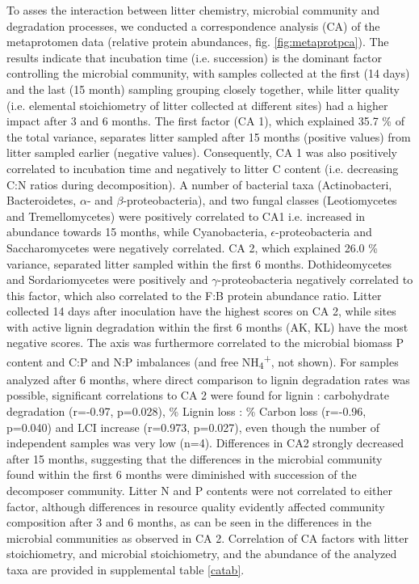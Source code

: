 To asses the interaction between litter chemistry, microbial community and degradation processes, we conducted a correspondence analysis (CA) of the metaprotomen data (relative protein abundances, fig. \ref{fig:metaprotpca}). The results indicate that incubation time (i.e. succession) is the dominant factor controlling the microbial community, with samples collected at the first (14 days) and the last (15 month) sampling grouping closely together, while litter quality (i.e. elemental stoichiometry of litter collected at different sites) had a higher impact after 3 and 6 months. The first factor (CA 1), which explained 35.7 \% of the total variance, separates litter sampled after 15 months (positive values) from litter sampled earlier (negative values). Consequently, CA 1 was also positively correlated to incubation time and negatively to litter C content (i.e. decreasing C:N ratios during decomposition). A number of bacterial taxa (Actinobacteri, Bacteroidetes, $\alpha$- and $\beta$-proteobacteria), and two fungal classes (Leotiomycetes and Tremellomycetes) were positively correlated to CA1 i.e. increased in abundance towards 15 months, while Cyanobacteria, $\epsilon$-proteobacteria and Saccharomycetes were negatively correlated. CA 2, which explained 26.0 \% variance, separated litter sampled within the first 6 months. Dothideomycetes and Sordariomycetes were positively and $\gamma$-proteobacteria negatively correlated to this factor, which also correlated to the F:B protein abundance ratio. Litter collected 14 days after inoculation have the highest scores on CA 2, while sites with active lignin degradation within the first 6 months (AK, KL) have the most negative scores. The axis was furthermore correlated to the microbial biomass P content and C:P and N:P imbalances (and free NH\textsubscript{4}\textsuperscript{+}, not shown). For samples analyzed after 6 months, where direct comparison to lignin degradation rates was possible, significant correlations to CA 2 were found for lignin : carbohydrate degradation (r=-0.97, p=0.028), \% Lignin loss : \% Carbon loss (r=-0.96, p=0.040) and  LCI increase (r=0.973, p=0.027), even though the number of independent samples was very low (n=4). Differences in CA2 strongly decreased after 15 months, suggesting that the differences in the microbial community found within the first 6 months were diminished with succession of the decomposer community. Litter N and P contents were not correlated to either factor, although differences in resource quality evidently affected community composition after 3 and 6 months, as can be seen in the differences in the microbial communities as observed in CA 2. Correlation of CA factors with litter stoichiometry, and microbial stoichiometry, and the abundance of the analyzed taxa are provided in supplemental table \ref{catab}.